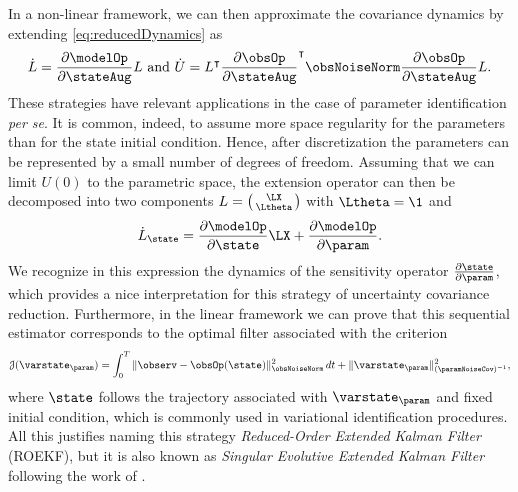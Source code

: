 \documentclass{tufte-book}
\begin{document}
In a non-linear framework, we can then approximate the covariance dynamics by extending \eqref{eq:reducedDynamics} as
\begin{equation}\label{eq:nl-reducedDynamics}
	\dot{L} = \frac{\partial \modelOp}{\partial \stateAug} L \text{ and }
	\dot{U} = L^\intercal \frac{\partial \obsOp}{\partial \stateAug}^\intercal \obsNoiseNorm \frac{\partial \obsOp}{\partial \stateAug} L.
\end{equation}
These strategies have relevant applications in the case of parameter identification \emph{per se}. It is common, indeed, to assume more space regularity for the parameters than for the state initial condition. Hence, after discretization the parameters can be represented by a small number of degrees of freedom. Assuming that we can limit $U(0)$ to the parametric space, the extension operator can then be decomposed into two components $L = \left( \begin{smallmatrix} \LX \\ \Ltheta \end{smallmatrix} \right)$ with $\Ltheta = \1$ and
\begin{equation}\label{eq:sensitivity}
	\dot{L}_\state = \frac{\partial \modelOp}{\partial \state} \LX + \frac{\partial \modelOp}{\partial \param}.
\end{equation}
We recognize in this expression the dynamics of the sensitivity operator $\frac{\partial \state}{\partial \param}$, which provides a nice interpretation for this strategy of uncertainty covariance reduction. Furthermore, in the linear framework we can prove that this sequential estimator corresponds to the optimal filter associated with the criterion
\begin{equation}\label{eq:paramCriterion}
	\mathcal{J}(\varstate_{\param}) = \int_0^T \|\observ-\obsOp(\state)\|_{\obsNoiseNorm}^2 \, dt +  \|\varstate_{\param}\|_{(\paramNoiseCov)^{-1}}^2,
\end{equation}
where $\state$ follows the trajectory associated with $\varstate_{\param}$ and fixed initial condition, which is commonly used in variational identification procedures. All this justifies naming this strategy \emph{Reduced-Order Extended Kalman Filter} (ROEKF), but it is also known as \emph{Singular Evolutive Extended Kalman Filter} following the work of \cite{Pham:1998p44}.
\end{document}
